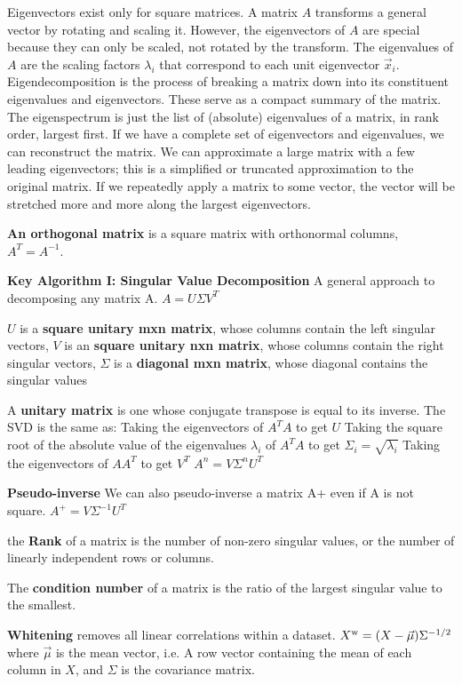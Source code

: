 \documentclass{article}
\begin{document}
Eigenvectors exist only for square matrices.
A matrix $A$ transforms a general vector by rotating and scaling it.
However, the eigenvectors of $A$ are special because they can only be scaled, not rotated by the transform.
The eigenvalues of $A$ are the scaling factors $\lambda_i$ that correspond to each unit eigenvector $\vec{x}_i$.
Eigendecomposition is the process of breaking a matrix down into its constituent eigenvalues
and eigenvectors. These serve as a compact summary of the matrix.
The eigenspectrum is just the list of (absolute) eigenvalues of a matrix, in rank order, largest first.
If we have a complete set of eigenvectors and eigenvalues, we can reconstruct the matrix.
We can approximate a large matrix with a few leading eigenvectors; this is a simplified or
truncated approximation to the original matrix.
If we repeatedly apply a matrix to some vector, the vector will be stretched more and more
along the largest eigenvectors.

\textbf{An orthogonal matrix} is a square matrix with orthonormal columns, $A^T = A^{-1}$.

\textbf{Key Algorithm I\@: Singular Value Decomposition}
A general approach to decomposing any matrix A.
$A = U \Sigma V^T$

$U$ is a \textbf{square unitary mxn matrix}, whose columns contain the left singular vectors,
$V$ is an \textbf{square unitary nxn matrix}, whose columns contain the right singular vectors,
$\Sigma$ is a \textbf{diagonal mxn matrix}, whose diagonal contains the singular values

A \textbf{unitary matrix} is one whose conjugate transpose is equal to its inverse.
The SVD is the same as:
Taking the eigenvectors of $A^T A$ to get $U$
Taking the square root of the absolute value of the eigenvalues $\lambda_i$ of $A^T A$ to get $\Sigma_i = \sqrt{\lambda_i}$
Taking the eigenvectors of $A A^T$ to get $V^T$
$A^n = V \Sigma^n U^T$

\textbf{Pseudo-inverse}
We can also pseudo-inverse a matrix A+ even if A is not square.
$A^+ = V \Sigma^{-1} U^T$

the \textbf{Rank} of a matrix is the number of non-zero singular values,
or the number of linearly independent rows or columns.

The \textbf{condition number} of a matrix is the ratio of the largest singular value to the smallest.

\textbf{Whitening} removes all linear correlations within a dataset.
$X^{\text w} = (X - \vec{\mu}) \Sigma^{-1/2}$ where $\vec{\mu}$ is the mean vector, i.e.
A row vector containing the mean of each column in $X$, and $\Sigma$ is the covariance matrix.
\end{document}
